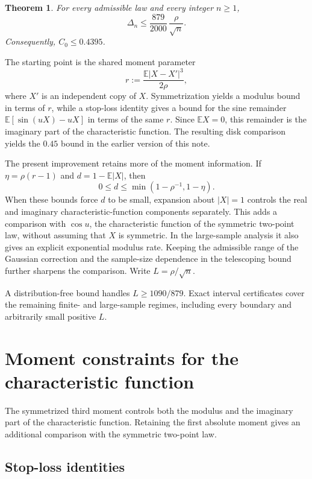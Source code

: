 \documentclass[11pt]{article}
\newtheorem{theorem}{Theorem}
\newcommand{\E}{\mathbb E}
\begin{document}
\begin{theorem}\label{thm:main}
For every admissible law and every integer \(n\ge1\),
\[
  \Delta_n\le \frac{879}{2000}\,\frac{\rho}{\sqrt n}.
\]
Consequently, \(C_0\le0.4395\).
\end{theorem}

The starting point is the shared moment parameter
\[
 r:=\frac{\E|X-X'|^3}{2\rho},
\]
where \(X'\) is an independent copy of \(X\). Symmetrization yields a
modulus bound in terms of \(r\), while a stop-loss identity gives a bound
for the sine remainder \(\E[\sin(uX)-uX]\) in terms of the same \(r\).
Since \(\E X=0\), this remainder is the imaginary part of the
characteristic function. The resulting disk
comparison yields the \(0.45\) bound in the earlier version of this note.

The present improvement retains more of the moment information. If
\(\eta=\rho(r-1)\) and \(d=1-\E|X|\), then
\[
 0\le d\le\min(1-\rho^{-1},1-\eta).
\]
When these bounds force \(d\) to be small, expansion about \(|X|=1\)
controls the real and imaginary characteristic-function components
separately. This adds a comparison with \(\cos u\), the characteristic
function of the symmetric two-point law, without assuming that \(X\)
is symmetric. In the large-sample analysis it also gives an explicit
exponential modulus rate. Keeping the admissible range of the Gaussian
correction and the sample-size dependence in the telescoping bound further
sharpens the comparison. Write \(L=\rho/\sqrt n\).

A distribution-free bound handles \(L\ge1090/879\). Exact interval
certificates cover the remaining finite- and large-sample regimes,
including every boundary and arbitrarily small positive \(L\).

\section{Moment constraints for the characteristic function}\label{sec:moment-parameter}

The symmetrized third moment controls both the modulus and the imaginary
part of the characteristic function. Retaining the first absolute moment
gives an additional comparison with the symmetric two-point law.

\subsection{Stop-loss identities}\label{sec:moment-geometry}
\end{document}
